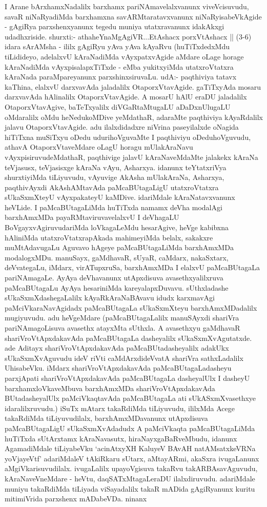 \begin{artha}
I Arane bArxhamxNadalilx barxhamx pariNAmavelalxvanunx viveVcisuvudu, savaR niNaRyadiMda barxhamxna savARMtaratavxvanunx niNaRyisabeVkAgide - gAgiRya parxshenxyanunx tegedu muniya utatxravanunx idakAkxgi udadhxriside. shurxti:- athaheYnaMgAgiVR...EtAshacx porxVtAshacx || (3-6) idara sArAMsha - ililx gAgiRyu yAva yAva kAyaRvu (huTiTxdedxMdu tiLidideyo, adelalxvU kAraNadiMda vAyxpatxvAgide aMdare oLage horage kAraNadiMda vAyxpisalapxTiTxde - eMba yukitxyiMda utatxroVtatxra kAraNada paraMpareyanunx parxshinxsiruvaLu. udA:- paqthiviya tatavx kaThina, elalxvU darxvavAda jaladalilx OtaporxVtavAgide. gaTiTxyAda mosaru darxvavAda hAlinalilx OtaporxVtavAgide. A mosarU hAlU eraDU jaladalilx OtaporxVtavAgive, baTeTxyalilx diVGaRtaMtugaLU aDaDxnUlugaLU oMdaralilx oMdu heNedukoMDive yeMdathaR, adaraMte paqthiviya kAyaRdalilx jalavu OtaporxVtavAgide. adu ilalxdidadxre niVrina paseyilalxde oNagida hiTiTxna muSiTxyu oDedu udurihoVguvaMte I paqthiviyu oDeduhoVguvudu, athavA OtaporxVtaveMdare oLagU horagu mUlakAraNavu vAyxpisiruvudeMdathaR, paqthivige jalavU kAraNaveMdaMte jalakekx kAraNa teVjasusx, teVjasisxge kAraNa vAyu, Asharxya. idanunx teYtatxriVya shurxtiyiMda tiLiyuvudu, vAyuvige AkAsha mUlakAraNa, Asharxya, paqthivAyxdi AkAshAMtavAda paMcaBUtagaLigU utatxroVtatxra sUkaSxmXteyU vAyxpakateyU kaMDive. idariMdale kAraNatavxvanunx heVLide. I paMcaBUtagaLiMda huTiTxda namamx deVha modalAgi barxhAmxMDa payaRMtaviruvavelalxvU I deVhagaLU BoVgayxvAgiruvudariMda loVkagaLeMdu hesarAgive, heVge kabibxna hAliniMda utatxroVtatxrapAkada mahimeyiMda belalx, sakakxre muMtAdavugaLu Aguvavo hAgeye paMcaBUtagaLiMda barxhAmxMDa modalogxMDu. manuSayx, gaMdhavaR, sUyaR, caMdarx, nakaSxtarx, deVvategaLu, iMdarx, virATupxruSa, barxhAmxMDa I elalxvU paMcaBUtagaLa pariNAmagaLe. AyAya deVhavanunx utApxdisuva avasethxyalilxruva paMcaBUtagaLu AyAya hesariniMda kareyalapxDuvavu. sUthxladashe sUkaSxmXdashegaLalilx kAyaRkAraNaBAvavu idudx karxmavAgi paMciVkaraNavAgidadx paMcaBUtagaLa sUkaSxmXteyu barxhAmxMDadalilx mugiyuvudu. adu  heVgeMdare \mdash  (paMcaBUtagaLalilx manuSAyxdi shariVra pariNAmagoLisuva avasethx atayxMta sUthxla. A avasethxyu gaMdhavaR shariVroVtApxdakavAda paMcaBUtagaLa dasheyalilx sUkaSxmXvAgutatxde. ade Aditayx shariVroVtApxdakavAda paMcaBUtadasheyalilx adakUkx sUkaSxmXvAguvudu ideV riVti caMdArxdideVvatA shariVra sathxLadalilx UhisabeVku. iMdarx shariVroVtApxdakavAda paMcaBUtagaLadasheyu parxjApati shariVroVtApxdakavAda paMcaBUtagaLa dasheyalUlx I dasheyU barxhamxloVkaveMbuva barxhAmxMDa shariVroVtApxdakavAda BUtadasheyalUlx paMciVkaqtavAda paMcaBUtagaLa ati sUkASxmXvasethxye idaralilxruvudu.) iSuTx mAtarx takaRdiMda tiLiyuvudu, ililxMda Acege takaRdiMda tiLiyuvudilalx, barxhAmxMDavanunx utApxdisuva paMcaBUtagaLigU sUkaSxmXvAdadudx A paMciVkaqta paMcaBUtagaLiMda huTiTxda sUtArxtamx kAraNavasutx, hiraNayxgaBaRveMbudu, idanunx AgamadiMdale tiLiyabeVku `acinAtxyXH KaluyeV BAvAH natAMsatxkeVRNa yoVjayeVtf' adariMdaleV tAkiRkaru sUtarx, aMtayARmi, akaSxra ivugaLanunx aMgiVkarisuvudilalx. ivugaLalilx upayoVgisuva takaRvu takARBAsavAguvudu, kAraNaveVneMdare - heVtu, daqSATxMtagaLeraDU ilalxdiruvudu. adariMdale muniyu takaRdiMda tiLiyada viSayadalilx takaR mADida gAgiRyanunx kuritu mitimiVrida parxshenx mADabeVDa. ninanx 
\end{artha}
